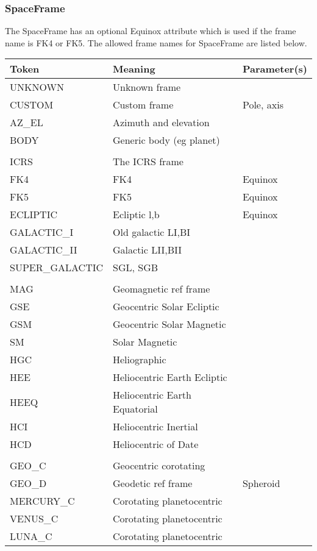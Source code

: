 \documentclass[11pt]{article}
\begin{document}
\subsubsection{SpaceFrame}

The SpaceFrame has an optional Equinox attribute which is used
if the frame name is FK4 or FK5. The allowed frame names for
SpaceFrame are listed below.

\begin{table}[h]
\small
\begin{tabular}{|lll|}
\hline
Token  &  Meaning & Parameter(s) \\
\hline
UNKNOWN  & Unknown frame & \\
CUSTOM  & Custom frame & Pole, axis \\
AZ\_EL   & Azimuth and elevation & \\
BODY    & Generic body (eg planet) & \\
&&\\
ICRS  & The ICRS frame & \\
FK4  &   FK4     &  Equinox \\
FK5  &   FK5      & Equinox\\
ECLIPTIC& Ecliptic l,b & Equinox\\
GALACTIC\_I& Old galactic LI,BI & \\
GALACTIC\_II& Galactic LII,BII  & \\
SUPER\_GALACTIC& SGL, SGB   & \\
&&\\
MAG   & Geomagnetic ref frame & \\
GSE   & Geocentric Solar Ecliptic  &\\
GSM  & Geocentric Solar Magnetic &\\
SM   & Solar Magnetic & \\
HGC & Heliographic  & \\
HEE  & Heliocentric Earth Ecliptic & \\
HEEQ & Heliocentric Earth Equatorial & \\
HCI  & Heliocentric Inertial & \\
HCD  & Heliocentric of Date & \\
&&\\
GEO\_C  & Geocentric corotating & \\
GEO\_D  & Geodetic ref frame  & Spheroid\\
MERCURY\_C & Corotating planetocentric & \\
VENUS\_C & Corotating planetocentric & \\
LUNA\_C & Corotating planetocentric & \\

\end{tabular}
\end{table}
\end{document}

